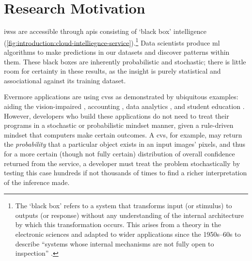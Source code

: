 \section{Research Motivation}%
\label{sec:introduction:motivation}



\glspl{iws} are accessible through \glspl{api} consisting of `black box' intelligence (\cref{fig:introduction:cloud-intelliegnce-service}).\footnote{The `black box' refers to a system that transforms input (or stimulus)  to outputs (or response) without any understanding of the internal architecture by which this transformation occurs. This arises from a theory in the electronic sciences and adapted to wider applications since the 1950s--60s \citep{Ashby:1957db,Bunge:1963jm} to describe ``systems whose internal mechanisms are not fully open to inspection'' \citep{Ashby:1957db}. }
Data scientists produce \gls{ml} algorithms to make predictions in our datasets and discover patterns within them. These black boxes are inherently probabilistic and stochastic; there is little room for certainty in these results, as the insight is purely statistical and associational \citep{Pearl:2018uv} against its training dataset. 

Evermore applications are using \glspl{cvs} as demonstrated by ubiquitous examples: aiding the vision-impaired \citep{Reis:2018cp,daMotaSilveira:2017vp}, accounting  \citep{Marshall:2018uj}, data analytics \citep{Iyengar:2017fb}, and student education \citep{Dibia:2017iy}.
However, developers who build these applications do not need to treat their programs in a stochastic or probabilistic mindset manner, given a rule-driven mindset that computers make certain outcomes.
A \gls{cvs}, for example, may return the \textit{probability} that a particular object exists in an input images' pixels, and thus for a more certain (though not fully certain) distribution of overall confidence returned from the service, a developer must treat the problem stochastically by testing this case hundreds if not thousands of times to find a richer interpretation of the inference made. 

